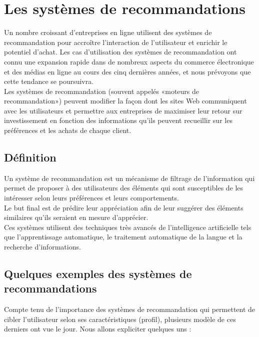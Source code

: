 \section{Les systèmes de recommandations}
Un nombre croissant d'entreprises en ligne utilisent des systèmes de recommandation pour accroître l'interaction de l'utilisateur et enrichir le potentiel d'achat. Les cas d'utilisation des systèmes de recommandation ont connu une expansion rapide dans de nombreux aspects du commerce électronique et des médias en ligne au cours des cinq dernières années, et nous prévoyons que cette tendance se poursuivra.\\ 
Les systèmes de recommandation (souvent appelés «moteurs de recommandation») peuvent modifier la façon dont les sites Web communiquent avec les utilisateurs et permettre aux entreprises de maximiser leur retour sur investissement en fonction des informations qu'ils peuvent recueillir sur les préférences et les achats de chaque client.
    \subsection{Définition}
    Un système de recommandation est un mécanisme de filtrage de l'information qui permet de proposer à des utilisateurs des éléments qui sont susceptibles de les intéresser selon leurs préférences et leurs comportements.\\
    Le but final est de prédire leur appréciation afin de leur suggérer des éléments similaires qu'ils seraient en mesure d'apprécier.\\
    Ces systèmes utilisent des techniques très avancés de l'intelligence artificielle tels que l'apprentissage automatique, le traitement automatique de la langue et la recherche d'informations. 

    \subsection{Quelques exemples des systèmes de recommandations}
    Compte tenu de l'importance des systèmes de recommandation qui permettent de cibler l'utilisateur selon ses caractéristiques (profil), plusieurs modèle de ces derniers ont vue le jour. Nous allons expliciter quelques uns :

